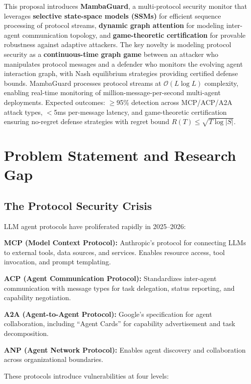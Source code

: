 \documentclass[12pt,a4paper]{article}
\newcommand{\calO}{\mathcal{O}}
\begin{document}
This proposal introduces \textbf{MambaGuard}, a multi-protocol security monitor that leverages \textbf{selective state-space models (SSMs)} for efficient sequence processing of protocol streams, \textbf{dynamic graph attention} for modeling inter-agent communication topology, and \textbf{game-theoretic certification} for provable robustness against adaptive attackers. The key novelty is modeling protocol security as a \textbf{continuous-time graph game} between an attacker who manipulates protocol messages and a defender who monitors the evolving agent interaction graph, with Nash equilibrium strategies providing certified defense bounds. MambaGuard processes protocol streams at $\calO(L \log L)$ complexity, enabling real-time monitoring of million-message-per-second multi-agent deployments. Expected outcomes: $\geq$95\% detection across MCP/ACP/A2A attack types, $<$5ms per-message latency, and game-theoretic certification ensuring no-regret defense strategies with regret bound $R(T) \leq \sqrt{T \log |S|}$.

\section{Problem Statement and Research Gap}

\subsection{The Protocol Security Crisis}

LLM agent protocols have proliferated rapidly in 2025--2026:

\textbf{MCP (Model Context Protocol):} Anthropic's protocol for connecting LLMs to external tools, data sources, and services. Enables resource access, tool invocation, and prompt templating.

\textbf{ACP (Agent Communication Protocol):} Standardizes inter-agent communication with message types for task delegation, status reporting, and capability negotiation.

\textbf{A2A (Agent-to-Agent Protocol):} Google's specification for agent collaboration, including ``Agent Cards'' for capability advertisement and task decomposition.

\textbf{ANP (Agent Network Protocol):} Enables agent discovery and collaboration across organizational boundaries.

These protocols introduce vulnerabilities at four levels:
\end{document}
